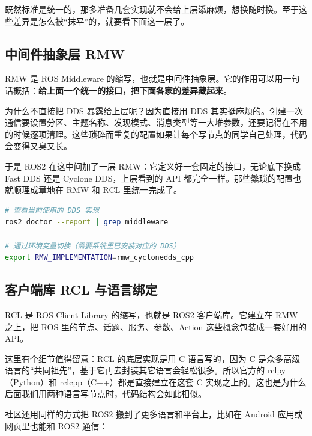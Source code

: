 \documentclass[12pt,a4paper]{ctexbook}
\begin{document}
既然标准是统一的，那多准备几套实现就不会给上层添麻烦，想换随时换。至于这些差异是怎么被“抹平”的，就要看下面这一层了。

\subsection{中间件抽象层 RMW}
RMW 是 ROS Middleware 的缩写，也就是中间件抽象层。它的作用可以用一句话概括：\textbf{给上面一个统一的接口，把下面各家的差异藏起来}。

为什么不直接把 DDS 暴露给上层呢？因为直接用 DDS 其实挺麻烦的。创建一次通信要设置分区、主题名称、发现模式、消息类型等一大堆参数，还要记得在不用的时候逐项清理。这些琐碎而重复的配置如果让每个写节点的同学自己处理，代码会变得又臭又长。

于是 ROS2 在这中间加了一层 RMW：它定义好一套固定的接口，无论底下换成 Fast DDS 还是 Cyclone DDS，上层看到的 API 都完全一样。那些繁琐的配置也就顺理成章地在 RMW 和 RCL 里统一完成了。

\begin{lstlisting}[language=bash,title={查看与切换 DDS 实现}]
# 查看当前使用的 DDS 实现
ros2 doctor --report | grep middleware

# 通过环境变量切换（需要系统里已安装对应的 DDS）
export RMW_IMPLEMENTATION=rmw_cyclonedds_cpp
\end{lstlisting}

\subsection{客户端库 RCL 与语言绑定}
RCL 是 ROS Client Library 的缩写，也就是 ROS2 客户端库。它建立在 RMW 之上，把 ROS 里的节点、话题、服务、参数、Action 这些概念包装成一套好用的 API。

这里有个细节值得留意：RCL 的底层实现是用 C 语言写的，因为 C 是众多高级语言的“共同祖先”，基于它再去封装其它语言会轻松很多。所以官方的 rclpy（Python）和 rclcpp（C++）都是直接建立在这套 C 实现之上的。这也是为什么后面我们用两种语言写节点时，代码结构会如此相似。

社区还用同样的方式把 ROS2 搬到了更多语言和平台上，比如在 Android 应用或网页里也能和 ROS2 通信：
\end{document}
